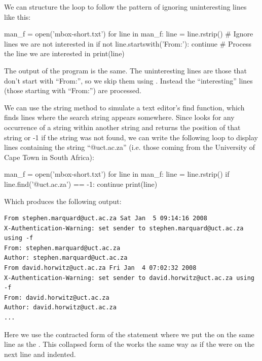 We can structure the loop to follow the pattern of ignoring uninteresting lines like this:

\begin{python}[frame=single]
man_f = open('mbox-short.txt')
for line in man_f:
    line = line.rstrip()
    # Ignore lines we are not interested in
    if not line.startswith('From:'):
        continue
    # Process the line we are interested in
    print(line)

\end{python}

The output of the program is the same. The uninteresting lines are those that don't start with ``From:'', so we skip them using . Instead the ``interesting'' lines (those starting with ``From:'') are processed.

We can use the  string method to simulate a text editor's find function, which finds lines where the search string appears somewhere. Since  looks for any occurrence of a string within another string and returns the position of that string or -1 if the string was not found, we can write the following loop to display lines containing the string ``@uct.ac.za'' (i.e. those coming from the University of Cape Town in South Africa):

\begin{python}[frame=single]
man_f = open('mbox-short.txt')
for line in man_f:
    line = line.rstrip()
    if line.find('@uct.ac.za') == -1: continue
    print(line)
\end{python}

Which produces the following output:

\begin{Verbatim}[frame=single]
From stephen.marquard@uct.ac.za Sat Jan  5 09:14:16 2008
X-Authentication-Warning: set sender to stephen.marquard@uct.ac.za using -f
From: stephen.marquard@uct.ac.za
Author: stephen.marquard@uct.ac.za
From david.horwitz@uct.ac.za Fri Jan  4 07:02:32 2008
X-Authentication-Warning: set sender to david.horwitz@uct.ac.za using -f
From: david.horwitz@uct.ac.za
Author: david.horwitz@uct.ac.za
...
\end{Verbatim}

Here we use the contracted form of the  statement where we put the  on the same line as the . This collapsed form of the  works the same way as if the  were on the next line and indented.

